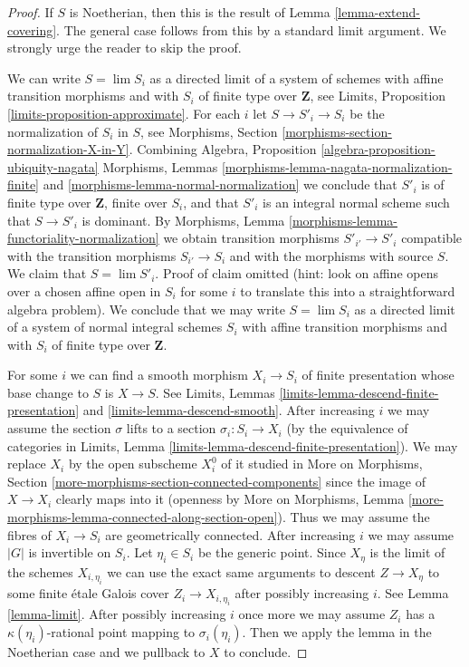 \begin{proof}
If $S$ is Noetherian, then this is the result of
Lemma \ref{lemma-extend-covering}. The general case
follows from this by a standard limit argument.
We strongly urge the reader to skip the proof.

\medskip\noindent
We can write $S = \lim S_i$ as a directed limit of a system
of schemes with affine transition morphisms and with $S_i$ of
finite type over $\mathbf{Z}$, see
Limits, Proposition \ref{limits-proposition-approximate}.
For each $i$ let $S \to S'_i \to S_i$ be the normalization
of $S_i$ in $S$, see
Morphisms, Section \ref{morphisms-section-normalization-X-in-Y}.
Combining Algebra, Proposition \ref{algebra-proposition-ubiquity-nagata}
Morphisms, Lemmas \ref{morphisms-lemma-nagata-normalization-finite} and
\ref{morphisms-lemma-normal-normalization}
we conclude that $S'_i$ is of finite type over $\mathbf{Z}$,
finite over $S_i$, and that $S'_i$ is an integral normal
scheme such that $S \to S'_i$ is dominant.
By Morphisms, Lemma \ref{morphisms-lemma-functoriality-normalization}
we obtain transition morphisms $S'_{i'} \to S'_i$ compatible
with the transition morphisms $S_{i'} \to S_i$ and with
the morphisms with source $S$.
We claim that $S = \lim S'_i$. Proof of claim omitted (hint:
look on affine opens over a chosen affine open in $S_i$
for some $i$ to translate this into a straightforward algebra
problem). We conclude that we may write $S = \lim S_i$
as a directed limit of a system of normal integral schemes $S_i$
with affine transition morphisms and with $S_i$ of
finite type over $\mathbf{Z}$.

\medskip\noindent
For some $i$ we can find a smooth morphism $X_i \to S_i$
of finite presentation whose base change to $S$ is $X \to S$.
See Limits, Lemmas
\ref{limits-lemma-descend-finite-presentation} and
\ref{limits-lemma-descend-smooth}.
After increasing $i$ we may assume the section
$\sigma$ lifts to a section $\sigma_i : S_i \to X_i$
(by the equivalence of categories in
Limits, Lemma \ref{limits-lemma-descend-finite-presentation}).
We may replace $X_i$ by the open subscheme $X_i^0$
of it studied in More on Morphisms, Section
\ref{more-morphisms-section-connected-components}
since the image of $X \to X_i$ clearly maps into it
(openness by More on Morphisms, Lemma
\ref{more-morphisms-lemma-connected-along-section-open}).
Thus we may assume the fibres of $X_i \to S_i$ are
geometrically connected.
After increasing $i$ we may assume $|G|$ is invertible
on $S_i$.
Let $\eta_i \in S_i$ be the generic point.
Since $X_\eta$ is the limit of the schemes
$X_{i, \eta_i}$ we can use the exact same arguments
to descent $Z \to X_\eta$ to some finite \'etale Galois
cover $Z_i \to X_{i, \eta_i}$ after possibly increasing $i$.
See Lemma \ref{lemma-limit}.
After possibly increasing $i$ once more we may
assume $Z_i$ has a $\kappa(\eta_i)$-rational point
mapping to $\sigma_i(\eta_i)$.
Then we apply the lemma in the Noetherian case
and we pullback to $X$ to conclude.
\end{proof}











